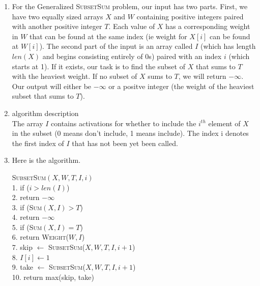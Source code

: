 \documentclass{article}
\begin{document}
\begin{enumerate}
    \item For the Generalized \textsc{SubsetSum} problem, our input has two parts.
    First, we have two equally sized arrays $X$ and $W$ containing positive integers paired with another positive integer $T$.
    Each value of $X$ has a corresponding weight in $W$ that can be found at the same index (ie weight for $X[i]$ can be found at $W[i]$).
    The second part of the input is an array called $I$ (which has length $len(X)$ and begins consisting entirely of 0s) paired with an index $i$ (which starts at 1).
    If it exists, our task is to find the subset of $X$ that sums to $T$ with the heaviest weight.
    If no subset of $X$ sums to $T$, we will return $-\infty$.
    Our output will either be $-\infty$ or a positve integer (the weight of the heaviest subset that sums to $T$).
    \item algorithm description \\
    The array $I$ contains activations for whether to include the $i^{th}$ element of $X$ in the subset (0 means don't include, 1 means include).
    The index i denotes the first index of $I$ that has not been yet been called.
    \item Here is the algorithm.
    \begin{algorithm}
        \textsc{SubsetSum}$(X, W, T, I, i)$ \\
        1.  \hspace{0em} if ($i > len(I)$) \\
        2.  \hspace{2em}     return $-\infty$ \\
        3.  \hspace{0em} if (\textsc{Sum}$(X, I) > T$) \\
        4.  \hspace{2em}     return $-\infty$ \\
        5.  \hspace{0em} if (\textsc{Sum}$(X, I) = T$) \\
        6.  \hspace{2em}     return \textsc{Weight}($W, I$) \\
        7.  \hspace{0em} skip $\leftarrow$ \textsc{SubsetSum}($X, W, T, I, i+1$) \\
        8.  \hspace{0em} $I[i] \leftarrow 1$ \\
        9.  \hspace{0em} take $\leftarrow$ \textsc{SubsetSum}($X, W, T, I, i+1$) \\
        10. \hspace{0em} return max(skip, take) \\


\end{algorithm}
\end{enumerate}
\end{document}
